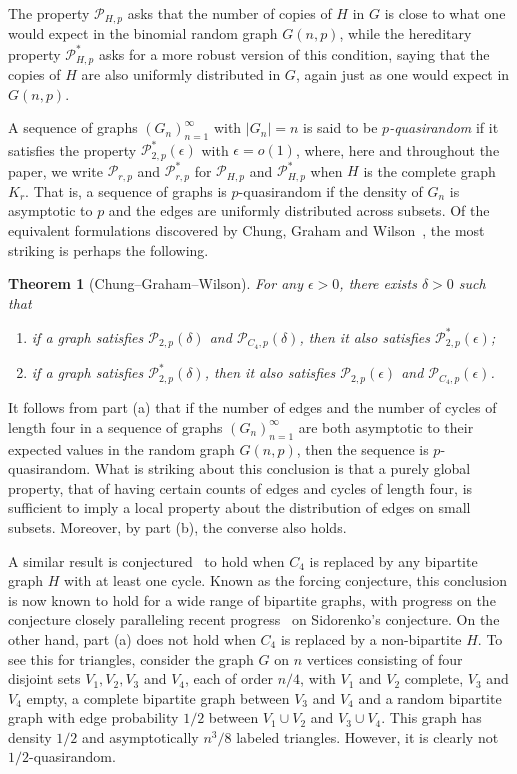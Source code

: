 \documentclass[11pt]{article}
\newtheorem*{theorem*}{Theorem}
\begin{document}
The property $\mathcal{P}_{H,p}$ asks that the number of copies of $H$ in $G$ is close to what one would expect in the binomial random graph $G(n,p)$, while the hereditary property $\mathcal{P}^*_{H,p}$ asks for a more robust version of this condition, saying that the copies of $H$ are also uniformly distributed in $G$, again just as one would expect in $G(n,p)$. 

A sequence of graphs $(G_n)_{n=1}^\infty$ with $|G_n| = n$ is said to be {\it $p$-quasirandom} if it satisfies the property $\mathcal{P}_{2, p}^*(\epsilon)$ with $\epsilon = o(1)$, where, here and throughout the paper, we write $\mathcal{P}_{r,p}$ and $\mathcal{P}^*_{r,p}$ for $\mathcal{P}_{H,p}$ and $\mathcal{P}^*_{H,p}$ when $H$ is the complete graph $K_r$. That is, a sequence of graphs is $p$-quasirandom if the density of $G_n$ is asymptotic to $p$ and the edges are uniformly distributed across subsets. Of the equivalent formulations discovered by Chung, Graham and Wilson~\cite{CGW}, the most striking is perhaps the following.

\begin{theorem*}[Chung--Graham--Wilson]
For any $\epsilon > 0$, there exists $\delta > 0$ such that
\begin{enumerate}
\item[(a)]
 if a graph satisfies $\mathcal{P}_{2,p}(\delta)$ and $\mathcal{P}_{C_4,p}(\delta)$, then it also satisfies $\mathcal{P}_{2, p}^*(\epsilon)$;
\item[(b)]
if a graph satisfies $\mathcal{P}_{2, p}^*(\delta)$, then it also satisfies $\mathcal{P}_{2,p}(\epsilon)$ and $\mathcal{P}_{C_4,p}(\epsilon)$.
\end{enumerate}
\end{theorem*}

It follows from part (a) that if the number of edges and the number of cycles of length four in a sequence of graphs $(G_n)_{n=1}^\infty$ are both asymptotic to their expected values in the random graph $G(n,p)$, then the sequence is $p$-quasirandom. What is striking about this conclusion is that a purely global property, that of having certain counts of edges and cycles of length four, is sufficient to imply a local property about the distribution of edges on small subsets. Moreover, by part (b), the converse also holds.

A similar result is conjectured~\cite{CFS10, ST04} to hold when $C_4$ is replaced by any bipartite graph $H$ with at least one cycle. Known as the forcing conjecture, this conclusion is now known to hold for a wide range of bipartite graphs, with progress on the conjecture closely paralleling recent progress~\cite{CFS10, CKLL16, KLL16, LSz16, Sz16} on Sidorenko's conjecture. On the other hand, part (a) does not hold when $C_4$ is replaced by a non-bipartite $H$. To see this for triangles, consider the graph $G$ on $n$ vertices consisting of four disjoint sets $V_1, V_2, V_3$ and $V_4$, each of order $n/4$, with $V_1$ and $V_2$ complete, $V_3$ and $V_4$ empty, a complete bipartite graph between $V_3$ and $V_4$ and a random bipartite graph with edge probability $1/2$ between $V_1 \cup V_2$ and $V_3 \cup V_4$. This graph has density $1/2$ and asymptotically $n^3/8$ labeled triangles. However, it is clearly not $1/2$-quasirandom.
\end{document}
